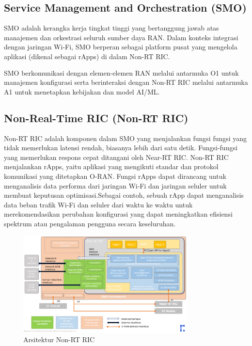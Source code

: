\subsection{Service Management and Orchestration (SMO)}
SMO adalah kerangka kerja tingkat tinggi yang bertanggung jawab atas manajemen dan orkestrasi seluruh sumber daya RAN. Dalam konteks integrasi dengan jaringan Wi-Fi, SMO berperan sebagai platform pusat yang mengelola aplikasi (dikenal sebagai rApps) di dalam Non-RT RIC.

SMO berkomunikasi dengan elemen-elemen RAN melalui antarmuka O1 untuk manajemen konfigurasi serta berinteraksi dengan Non-RT RIC melalui antarmuka A1 untuk menetapkan kebijakan dan model AI/ML.

\subsection{Non-Real-Time RIC (Non-RT RIC)}

Non-RT RIC adalah komponen dalam SMO yang menjalankan fungsi fungsi yang tidak memerlukan latensi rendah, biasanya lebih dari satu detik. Fungsi-fungsi yang memerlukan respons cepat ditangani oleh Near-RT RIC. Non-RT RIC menjalankan rApps, yaitu aplikasi yang mengikuti standar dan protokol komunikasi yang ditetapkan O-RAN. Fungsi rApps dapat dirancang untuk menganalisis data performa dari jaringan Wi-Fi dan jaringan seluler untuk membuat keputusan optimisasi.Sebagai contoh, sebuah rApp dapat menganalisis data beban trafik Wi-Fi dan seluler dari waktu ke waktu untuk merekomendasikan perubahan konfigurasi yang dapat meningkatkan efisiensi spektrum atau pengalaman pengguna secara keseluruhan.

\begin{figure}[htbp]
    \centering
    \includegraphics[width=0.8\textwidth]{assets/pics/oran-nonrt.png}
    \caption{Arsitektur Non-RT RIC}
     \label{fig:nonrt_ric_architecture}
\end{figure}

